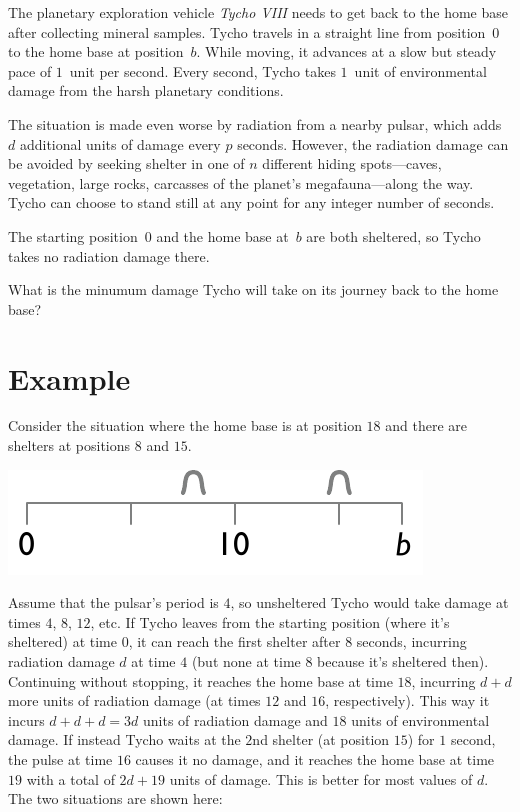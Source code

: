 

\noindent
The planetary exploration vehicle \emph{Tycho VIII} needs to get back to the home base after collecting mineral samples.
Tycho travels in a straight line from position~$0$ to the home base at position~$b$.
While moving, it advances at a slow but steady pace of $1$~unit per second.
Every second, Tycho takes $1$~unit of environmental damage from the harsh planetary conditions.

The situation is made even worse by radiation from a nearby pulsar, which adds $d$ additional units of damage every $p$ seconds.
However, the radiation damage can be avoided by seeking shelter in one of $n$ different hiding spots---caves, vegetation, large rocks, carcasses of the planet's megafauna---along the way.
Tycho can choose to stand still at any point for any integer number of seconds.

The starting position~$0$ and the home base at~$b$ are both sheltered, so Tycho takes no radiation damage there.

\medskip
What is the minumum damage Tycho will take on its journey back to the home base?

\section*{Example}

Consider the situation where the home base is at position $18$ and there are shelters at positions $8$ and $15$.

\includegraphics[width=.3\textwidth]{img/samplesetup}

Assume that the pulsar's period is $4$, so unsheltered Tycho would take damage at times $4$, $8$, $12$, etc.
If Tycho leaves from the starting position (where it's sheltered) at time $0$, it can reach the first shelter after $8$ seconds, incurring radiation damage $d$ at time $4$ (but none at time $8$ because it's sheltered then).
Continuing without stopping, it reaches the home base at time $18$, incurring $d+d$ more units of radiation damage (at times $12$ and $16$, respectively).
This way it incurs $d+d+d=3d$ units of radiation damage and $18$ units of environmental damage.
If instead Tycho waits at the $2$nd shelter (at position $15$) for $1$ second, the pulse at time $16$ causes it no damage, and it reaches the home base at time $19$ with a total of $2d + 19$ units of damage.
This is better for most values of $d$.
The two situations are shown here:

